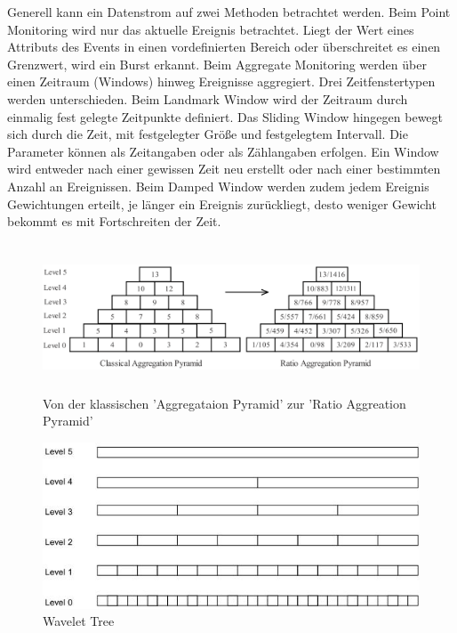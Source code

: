 Generell kann ein Datenstrom auf zwei Methoden betrachtet werden. Beim Point Monitoring wird nur das aktuelle Ereignis betrachtet. Liegt der Wert eines Attributs des Events in einen vordefinierten Bereich oder überschreitet es einen Grenzwert, wird ein Burst erkannt. Beim Aggregate Monitoring werden über einen Zeitraum (Windows) hinweg Ereignisse aggregiert. Drei Zeitfenstertypen werden unterschieden. Beim Landmark Window wird der Zeitraum durch einmalig fest gelegte Zeitpunkte definiert.
Das Sliding Window hingegen bewegt sich durch die Zeit, mit festgelegter Größe und festgelegtem Intervall. Die Parameter können als Zeitangaben oder als Zählangaben erfolgen. Ein Window wird entweder nach einer gewissen Zeit neu erstellt oder nach einer bestimmten Anzahl an Ereignissen. Beim Damped Window werden zudem jedem Ereignis Gewichtungen erteilt, je länger ein Ereignis zurückliegt, desto weniger Gewicht bekommt es mit Fortschreiten der Zeit. \cite{Zhu:2003:EEB:956750.956789}\\

\begin{figure}[htbp]
\centerline{\includegraphics[height=4.4cm]{images/ratiopyramid.png}}
\caption{Von der klassischen 'Aggregataion Pyramid' zur 'Ratio Aggreation Pyramid' \cite{yuan2007online}}
\label{fig:ratiopyramid}
\end{figure}


\begin{figure}[h]
    \includegraphics[width=.5\textwidth]{images/wavelet.jpg}
    \caption{Wavelet Tree \cite{Zhu:2003:EEB:956750.956789}}
    \label{fig:wavelet}
\end{figure}

